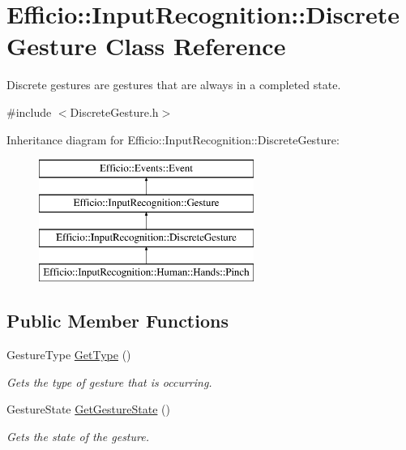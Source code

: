 \hypertarget{class_efficio_1_1_input_recognition_1_1_discrete_gesture}{}\section{Efficio\+:\+:Input\+Recognition\+:\+:Discrete\+Gesture Class Reference}
\label{class_efficio_1_1_input_recognition_1_1_discrete_gesture}


Discrete gestures are gestures that are always in a completed state.  




{\ttfamily \#include $<$Discrete\+Gesture.\+h$>$}

Inheritance diagram for Efficio\+:\+:Input\+Recognition\+:\+:Discrete\+Gesture\+:\begin{figure}[H]
\begin{center}
\leavevmode
\includegraphics[height=4.000000cm]{class_efficio_1_1_input_recognition_1_1_discrete_gesture}
\end{center}
\end{figure}
\subsection*{Public Member Functions}
\begin{DoxyCompactItemize}
\item 
\hypertarget{class_efficio_1_1_input_recognition_1_1_discrete_gesture_aa41d3e90b680094da94183a1a1ed3b2a}{}\label{class_efficio_1_1_input_recognition_1_1_discrete_gesture_aa41d3e90b680094da94183a1a1ed3b2a} 
Gesture\+Type \hyperlink{class_efficio_1_1_input_recognition_1_1_discrete_gesture_aa41d3e90b680094da94183a1a1ed3b2a}{Get\+Type} ()
\begin{DoxyCompactList}\small\item\em Gets the type of gesture that is occurring. \end{DoxyCompactList}\item 
\hypertarget{class_efficio_1_1_input_recognition_1_1_discrete_gesture_a18ff1c5231925c581ac3a6add9edfd67}{}\label{class_efficio_1_1_input_recognition_1_1_discrete_gesture_a18ff1c5231925c581ac3a6add9edfd67} 
Gesture\+State \hyperlink{class_efficio_1_1_input_recognition_1_1_discrete_gesture_a18ff1c5231925c581ac3a6add9edfd67}{Get\+Gesture\+State} ()
\begin{DoxyCompactList}\small\item\em Gets the state of the gesture. \end{DoxyCompactList}\end{DoxyCompactItemize}


